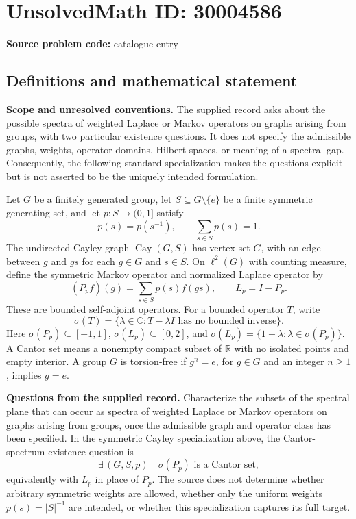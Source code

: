 \documentclass[11pt]{article}
\newcommand{\R}{\mathbb{R}}
\newcommand{\C}{\mathbb{C}}
\begin{document}
\section*{UnsolvedMath ID: 30004586}
\textbf{Source problem code:} catalogue entry
\subsection{Definitions and mathematical statement}
\textbf{Scope and unresolved conventions.} The supplied record asks about the possible spectra of weighted Laplace or Markov operators on graphs arising from groups, with two particular existence questions. It does not specify the admissible graphs, weights, operator domains, Hilbert spaces, or meaning of a spectral gap. Consequently, the following standard specialization makes the questions explicit but is not asserted to be the uniquely intended formulation.

Let \(G\) be a finitely generated group, let \(S\subseteq G\setminus\{e\}\) be a finite symmetric generating set, and let \(p:S\to(0,1]\) satisfy
\[
 p(s)=p(s^{-1}),\qquad \sum_{s\in S}p(s)=1.
\]
The undirected Cayley graph \(\operatorname{Cay}(G,S)\) has vertex set \(G\), with an edge between \(g\) and \(gs\) for each \(g\in G\) and \(s\in S\). On \(\ell^2(G)\) with counting measure, define the symmetric Markov operator and normalized Laplace operator by
\[
 (P_pf)(g)=\sum_{s\in S}p(s)f(gs),\qquad L_p=I-P_p.
\]
These are bounded self-adjoint operators. For a bounded operator \(T\), write
\[
 \sigma(T)=\{\lambda\in\C:T-\lambda I\text{ has no bounded inverse}\}.
\]
Here \(\sigma(P_p)\subseteq[-1,1]\), \(\sigma(L_p)\subseteq[0,2]\), and \(\sigma(L_p)=\{1-\lambda:\lambda\in\sigma(P_p)\}\). A Cantor set means a nonempty compact subset of \(\R\) with no isolated points and empty interior. A group \(G\) is torsion-free if \(g^n=e\), for \(g\in G\) and an integer \(n\geq1\), implies \(g=e\).

\textbf{Questions from the supplied record.} Characterize the subsets of the spectral plane that can occur as spectra of weighted Laplace or Markov operators on graphs arising from groups, once the admissible graph and operator class has been specified. In the symmetric Cayley specialization above, the Cantor-spectrum existence question is
\[
 \exists\,(G,S,p)\quad \sigma(P_p)\text{ is a Cantor set},
\]
 equivalently with \(L_p\) in place of \(P_p\). The source does not determine whether arbitrary symmetric weights are allowed, whether only the uniform weights \(p(s)=|S|^{-1}\) are intended, or whether this specialization captures its full target.
\end{document}
